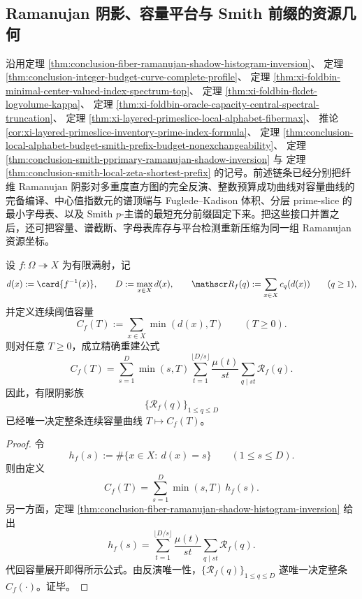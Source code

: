 \subsection{Ramanujan 阴影、容量平台与 Smith 前缀的资源几何}\label{subsec:conclusion-ramanujan-capacity-center-primeslice-smith-plateau}
沿用定理 \ref{thm:conclusion-fiber-ramanujan-shadow-histogram-inversion}、
定理 \ref{thm:conclusion-integer-budget-curve-complete-profile}、
定理 \ref{thm:xi-foldbin-minimal-center-valued-index-spectrum-top}、
定理 \ref{thm:xi-foldbin-fkdet-logvolume-kappa}、
定理 \ref{thm:xi-foldbin-oracle-capacity-central-spectral-truncation}、
定理 \ref{thm:xi-layered-primeslice-local-alphabet-fibermax}、
推论 \ref{cor:xi-layered-primeslice-inventory-prime-index-formula}、
定理 \ref{thm:conclusion-local-alphabet-budget-smith-prefix-budget-nonexchangeability}、
定理 \ref{thm:conclusion-smith-pprimary-ramanujan-shadow-inversion} 与
定理 \ref{thm:conclusion-smith-local-zeta-shortest-prefix} 的记号。前述链条已经分别把纤维 Ramanujan 阴影对多重度直方图的完全反演、整数预算成功曲线对容量曲线的完备编译、中心值指数元的谱顶端与 Fuglede--Kadison 体积、分层 prime-slice 的最小字母表、以及 Smith \(p\)-主谱的最短充分前缀固定下来。把这些接口并置之后，还可把容量、谱截断、字母表库存与平台检测重新压缩为同一组 Ramanujan 资源坐标。

\begin{theorem}\label{thm:conclusion-fiber-ramanujan-shadow-capacity-reconstruction}
设 \(f:\Omega\twoheadrightarrow X\) 为有限满射，记
\[
d(x):=\card{f^{-1}(x)},
\qquad
D:=\max_{x\in X}d(x),
\qquad
\mathscr R_f(q):=\sum_{x\in X}c_q(d(x))
\qquad(q\ge 1),
\]
并定义连续阈值容量
\[
C_f(T):=\sum_{x\in X}\min(d(x),T)
\qquad(T\ge 0).
\]
则对任意 \(T\ge 0\)，成立精确重建公式
\[
C_f(T)
=
\sum_{s=1}^{D}\min(s,T)
\sum_{t=1}^{\lfloor D/s\rfloor}
\frac{\mu(t)}{st}\sum_{q\mid st}\mathscr R_f(q).
\]
因此，有限阴影族
\[
\{\mathscr R_f(q)\}_{1\le q\le D}
\]
已经唯一决定整条连续容量曲线 \(T\mapsto C_f(T)\)。
\end{theorem}

\begin{proof}
令
\[
h_f(s):=\#\{x\in X:\ d(x)=s\}
\qquad(1\le s\le D).
\]
则由定义
\[
C_f(T)=\sum_{s=1}^{D}\min(s,T)\,h_f(s).
\]
另一方面，定理 \ref{thm:conclusion-fiber-ramanujan-shadow-histogram-inversion} 给出
\[
h_f(s)
=
\sum_{t=1}^{\lfloor D/s\rfloor}\frac{\mu(t)}{st}\sum_{q\mid st}\mathscr R_f(q).
\]
代回容量展开即得所示公式。由反演唯一性，\(\{\mathscr R_f(q)\}_{1\le q\le D}\) 遂唯一决定整条 \(C_f(\cdot)\)。证毕。
\end{proof}

